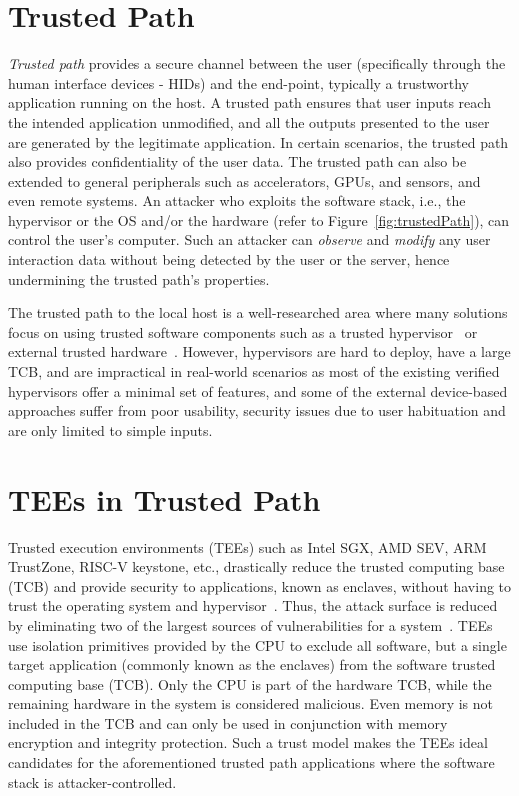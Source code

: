 \section{Trusted Path}

\emph{Trusted path} provides a secure channel between the user (specifically through the human interface devices - HIDs) and the end-point, typically a trustworthy application running on the host. A trusted path ensures that user inputs reach the intended application unmodified, and all the outputs presented to the user are generated by the legitimate application. In certain scenarios, the trusted path also provides confidentiality of the user data. The trusted path can also be extended to general peripherals such as accelerators, GPUs, and sensors, and even remote systems. An attacker who exploits the software stack, i.e., the hypervisor or the OS and/or the hardware (refer to Figure~\ref{fig:trustedPath}), can control the user's computer. Such an attacker can \emph{observe} and \emph{modify} any user interaction data without being detected by the user or the server, hence undermining the trusted path's properties. 

The trusted path to the local host is a well-researched area where many solutions focus on using trusted software components such as a trusted hypervisor~\cite{zhou2012building} or external trusted hardware~\cite{filyanov2011uni,weigold2011secure,McCPerRei2006,mannan2007using,Fidelius}. However, hypervisors are hard to deploy, have a large TCB, and are impractical in real-world scenarios as most of the existing verified hypervisors offer a minimal set of features, and some of the external device-based approaches suffer from poor usability, security issues due to user habituation and are only limited to simple inputs.


\section{TEEs in Trusted Path}

Trusted execution environments (TEEs) such as Intel SGX, AMD SEV, ARM TrustZone, RISC-V keystone, etc., drastically reduce the trusted computing base (TCB) and provide security to applications, known as enclaves, without having to trust the operating system and hypervisor~\cite{costan2016intel,winter2008trusted,costan2016sanctum}. Thus, the attack surface is reduced by eliminating two of the largest sources of vulnerabilities for a system~\cite{checkoway2013iago,suzaki2011memory}. TEEs use isolation primitives provided by the CPU to exclude all software, but a single target application (commonly known as the enclaves) from the software trusted computing base (TCB). Only the CPU is part of the hardware TCB, while the remaining hardware in the system is considered malicious. Even memory is not included in the TCB and can only be used in conjunction with memory encryption and integrity protection. Such a trust model makes the TEEs ideal candidates for the aforementioned trusted path applications where the software stack is attacker-controlled. 


